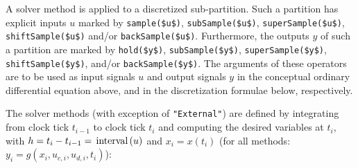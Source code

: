 A solver method is applied to a discretized sub-partition.
Such a partition has explicit inputs $u$ marked by \lstinline!sample($u$)!, \lstinline!subSample($u$)!, \lstinline!superSample($u$)!, \lstinline!shiftSample($u$)! and/or \lstinline!backSample($u$)!.
Furthermore, the outputs $y$ of such a partition are marked by \lstinline!hold($y$)!, \lstinline!subSample($y$)!, \lstinline!superSample($y$)!, \lstinline!shiftSample($y$)!, and/or \lstinline!backSample($y$)!.
The arguments of these operators are to be used as input signals $u$ and output signals $y$ in the conceptual ordinary differential equation above, and in the discretization formulae below, respectively.

The solver methods (with exception of \lstinline!"External"!) are defined by
integrating from clock tick $t_{i-1}$ to clock tick
$t_{i}$ and computing the desired variables at
$t_{i}$, with $h = t_{i} - t_{i-1} = \text{\lstinline!interval!}(u)$ and
$x_{i} = x(t_{i})$ (for all methods: $y_i = g(x_i,u_{c,i},u_{d,i},t_i)$):

